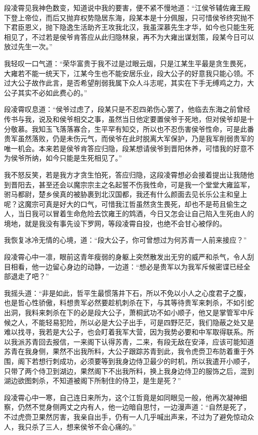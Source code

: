 段凌霄见我神色数变，知道说中我的要害，便不紧不慢地道：“江侯爷辅佐雍王殿下登上帝位，而后又抛弃权势隐居东海，段某本是十分佩服，只可惜侯爷终究抛不下君臣恩义，抛下隐逸生活助齐王攻我北汉，我虽深慕先生才华，如今也只能生死相见了，不过若是侯爷肯答应从此归隐林泉，再不为大雍出谋划策，段某今日可以放过先生一次。”

我轻叹一口气道：“荣华富贵于我不过是过眼云烟，只是江某生平最是贪生畏死，大雍若不能一统天下，江某今生也不能安居乐业，段大公子的好意我只能心领。不过大公子故作此言，是否希望削弱我属下众人斗志呢，其实在下手无缚鸡之力，大公子其实不必如此费心的。”

段凌霄叹息道：“侯爷过虑了，段某只是不忍四弟伤心罢了，他临去东海之前曾经传书与我，说及和侯爷相交之事，虽然当日他定要置侯爷于死地，但对侯爷却是十分敬慕。我知玉飞落落寡合，生平罕有知交，所以也不忍伤害侯爷性命，可是此番贵军虽然落败，仍是未伤元气，而侯爷在此时脱离大军保护，乃是我军削弱贵军的唯一机会。本来若是侯爷肯答应归隐，段某想请侯爷到晋阳休养，可惜我的好意不为侯爷所纳，如今只能是生死相见了。”

我不怒反笑，若是我方才贪生怕死，答应归隐，这段凌霄想必会接着提出让我随他到晋阳去，甚至还会以魔宗宗主之名起誓不伤我性命，可是我一个堂堂大雍监军，驸马都尉，楚乡侯真的被胁裹到北汉国都，我还有什么颜面去见长乐公主和皇上呢？这魔宗可真是好大的口气，可惜我江哲虽然贪生畏死，却也不是苟且偷生之人，当日我可以冒着生命危险去饮雍王的鸩酒，今日又怎会让自己陷入生死由人的境地，就是我没有事先设下罗网，等段凌霄自投，也绝不会甘心被俘的。

我恢复冰冷无情的心境，道：“段大公子，你可曾想过为何苏青一人前来接应？”

段凌霄心中一凛，眼前这青年瘦弱的身躯上突然散发出无穷的威严和杀气，令人刮目相看，他一边留心身边的动静，一边道：“想必是贵军以为我军斥候密谍已经全部退走了吧？”

我摇头道：“非是如此，哲平生最惯落井下石，所以不免以小人之心度君子之腹，也是哲心性骄傲，料想贵军必然要趁机刺杀在下，与其等待贵军来刺杀，不如引蛇出洞，我料来刺杀在下的必是段大公子，萧桐武功不如小顺子，他又是掌管军中斥候之人，不能轻易犯险，所以必是大公子出手，可是四野茫茫，我们隐蔽之处又是难以找寻，我若是大公子，也会盯着我军大营，因为我势必要和中军取得联系。所以我派苏青回去报信，一来阁下认得苏青，二来，有段无敌在安泽，应该可能知道苏青在我身侧，果然不出我所料，大公子跟踪苏青到此，我令虎赍卫布防着重于外围，阁下若想行刺成功，必须要等到我身边侍卫最少的时机，所以我遣开小顺子，只带了两个侍卫到湖边，果然阁下不出我所料，换上我身边侍卫的服饰之后，混到湖边欲图刺杀，不知道被阁下所制住的侍卫，是生是死？”

段凌霄心中一寒，自己连日来所为，这个江哲竟是如同眼见一般，他再次凝神细察，仍然不觉身侧两丈之内有人，他一边暗自思忖，一边漫声道：“自然是死了，不过虎赍卫果然厉害，我亲自出手，仍有一人几乎喊出声来，不过为了避免惊动众人，我只杀了三人，想来侯爷不会心痛的。”


